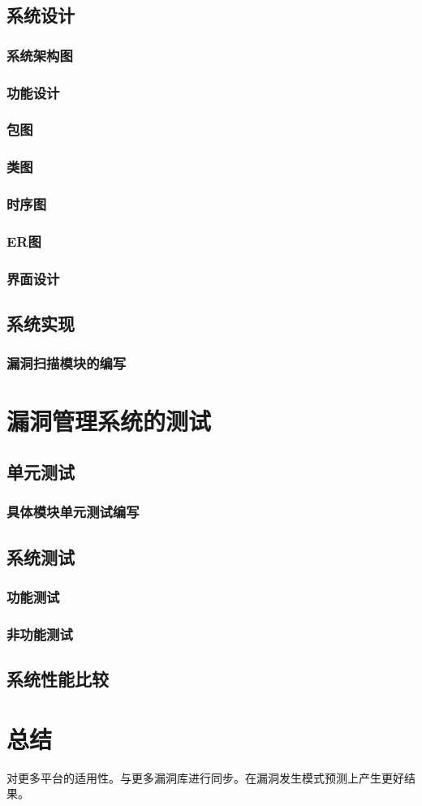 \documentclass[a4paper]{ctexrep}
\begin{document}
		\section{系统设计}
			\subsection{系统架构图}
			\subsection{功能设计}
			\subsection{包图}
			\subsection{类图}
			\subsection{时序图}
			\subsection{ER图}
			\subsection{界面设计}

		\section{系统实现}
			\subsection{漏洞扫描模块的编写}
	\chapter{漏洞管理系统的测试}
		\section{单元测试}
			\subsection{具体模块单元测试编写}
		\section{系统测试}
			\subsection{功能测试}
			\subsection{非功能测试}
		\section{系统性能比较}
	\chapter{总结}
	对更多平台的适用性。与更多漏洞库进行同步。在漏洞发生模式预测上产生更好结果。
	
\end{document}
